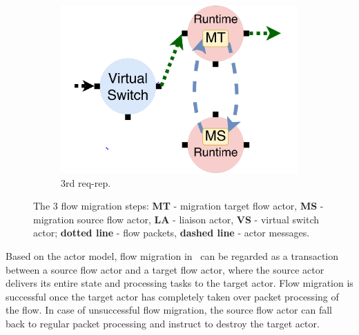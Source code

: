 \begin{figure}[!t]
  \begin{subfigure}[t]{0.33\linewidth}
 \centering
   \includegraphics[width=\columnwidth]{figure/nfactor-mig3.pdf}
   \caption{3rd req-rep.}\label{fig:mig3} \end{subfigure}\hfill
 \caption{The 3 flow migration steps: \textbf{MT} - migration target flow actor, \textbf{MS} - migration source flow actor, \textbf{LA} - liaison actor, \textbf{VS} - virtual switch actor; \textbf{dotted line} - flow packets, \textbf{dashed line} - actor messages.}
\label{fig:mig}
\end{figure}

Based on the actor model, flow migration in \nfactor~can be regarded as a transaction between a source flow actor and a target flow actor, where the source actor delivers its entire state and processing tasks to the target actor. Flow migration is successful once the target actor has completely taken over packet processing of the flow. %
 In case of unsuccessful flow migration, the source flow actor can fall back to regular packet processing and instruct to destroy the target actor.

